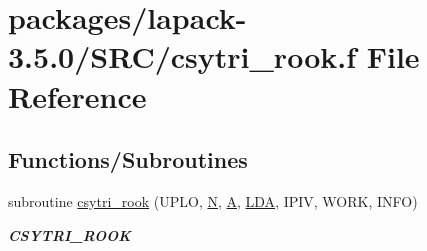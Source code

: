 \hypertarget{csytri__rook_8f}{}\section{packages/lapack-\/3.5.0/\+S\+R\+C/csytri\+\_\+rook.f File Reference}
\label{csytri__rook_8f}
\subsection*{Functions/\+Subroutines}
\begin{DoxyCompactItemize}
\item 
subroutine \hyperlink{group__complexSYcomputational_gafb343bb24f1cd1459070aeff219956ad}{csytri\+\_\+rook} (U\+P\+L\+O, \hyperlink{polmisc_8c_a0240ac851181b84ac374872dc5434ee4}{N}, \hyperlink{classA}{A}, \hyperlink{example__user_8c_ae946da542ce0db94dced19b2ecefd1aa}{L\+D\+A}, I\+P\+I\+V, W\+O\+R\+K, I\+N\+F\+O)
\begin{DoxyCompactList}\small\item\em {\bfseries C\+S\+Y\+T\+R\+I\+\_\+\+R\+O\+O\+K} \end{DoxyCompactList}\end{DoxyCompactItemize}
